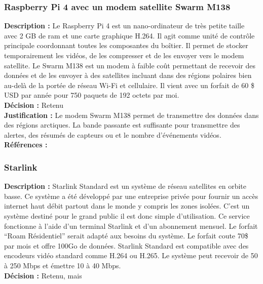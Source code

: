 \subsubsection{Raspberry Pi 4 avec un modem satellite Swarm M138}

\noindent
\textbf{Description :} Le Raspberry Pi 4 est un nano-ordinateur de très petite taille
avec 2 GB de ram et une carte graphique H.264. Il agit comme unité de contrôle
principale coordonnant toutes les composantes du boîtier. Il permet de stocker
temporairement les vidéos, de les compresser et de les envoyer vers le modem
satellite. Le Swarm M138 est un modem à faible coût permettant de recevoir des
données et de les envoyer à des satellites incluant dans des régions polaires
bien au-delà de la portée de réseau Wi-Fi et cellulaire. Il vient avec un
forfait de 60 \$ USD par année pour 750 paquets de 192 octets par moi. \\

\noindent
\textbf{Décision :} Retenu \\

\noindent
\textbf{Justification :} Le modem Swarm M138 permet de transmettre des
données dans des régions arctiques. La bande passante est suffisante pour
transmettre des alertes, des résumés de capteurs ou et le nombre
d’événements vidéos. \\

\noindent
\textbf{Références :} \cite{25} \cite{26} \\

\subsubsection{Starlink}

\noindent
\textbf{Description :} Starlink Standard est un système de réseau satellites en orbite basse. Ce système a été développé par une entreprise privée pour fournir un accès internet haut débit partout dans le monde y compris les zones isolées. C’est un système destiné pour le grand public il est donc simple d’utilisation.
Ce service fonctionne à l’aide d’un terminal Starlink et d’un abonnement mensuel. Le forfait “Roam Résidentiel” serait adapté aux besoins du système. Le forfait coute 70\$ par mois et offre 100Go de données.
Starlink Standard est compatible avec des encodeurs vidéo standard comme H.264 ou H.265. Le système peut recevoir de 50 à 250 Mbps et émettre 10 à 40 Mbps. \\

\noindent
\textbf{Décision :} Retenu, mais \\

